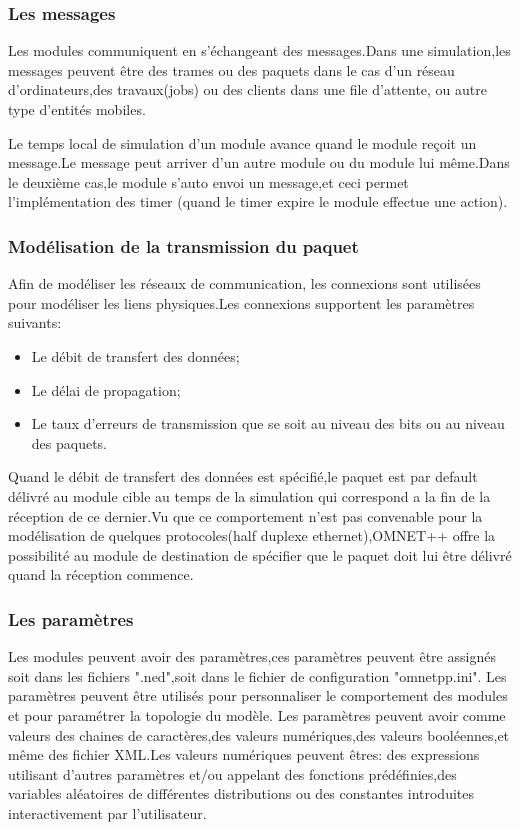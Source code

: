 \subsubsection{Les messages}
Les modules communiquent en s'échangeant des messages.Dans une simulation,les messages peuvent être des trames ou des paquets dans le cas d'un réseau d'ordinateurs,des travaux(jobs) ou des clients dans une file d'attente, ou autre type d'entités mobiles.

Le temps local de simulation d'un module avance quand le module reçoit un message.Le message peut arriver d'un autre module ou du module lui même.Dans le deuxième cas,le module s'auto envoi un message,et ceci permet l'implémentation des timer (quand le timer expire le module effectue une action).
\subsubsection{Modélisation de la transmission du paquet}
Afin de modéliser les réseaux de communication,
les connexions sont utilisées pour modéliser les liens physiques.Les connexions supportent les paramètres suivants:
\begin{itemize}
\item Le débit de transfert des données;
\item Le délai de propagation;
\item Le taux d'erreurs de transmission que se soit au niveau des bits ou au niveau des paquets.
\end{itemize}

Quand le débit de transfert des données est spécifié,le paquet est par default délivré au module cible au temps de la simulation qui correspond a la fin de la réception de ce dernier.Vu que ce comportement n'est pas convenable pour la modélisation de quelques protocoles(half duplexe ethernet),OMNET++ offre la possibilité au module de destination de spécifier que le paquet doit lui être délivré quand la réception commence.
\subsubsection{Les paramètres}
Les modules peuvent avoir des paramètres,ces paramètres peuvent être assignés  soit dans les fichiers ".ned",soit dans le fichier de configuration  "omnetpp.ini".
Les paramètres peuvent être utilisés pour personnaliser le comportement des modules  et pour paramétrer la topologie du modèle.
Les paramètres peuvent avoir comme valeurs des chaines de caractères,des valeurs numériques,des valeurs booléennes,et même des fichier XML.Les valeurs numériques  peuvent êtres: des expressions utilisant d'autres paramètres et/ou appelant des fonctions prédéfinies,des variables aléatoires de différentes distributions  ou des constantes introduites interactivement par l'utilisateur.

